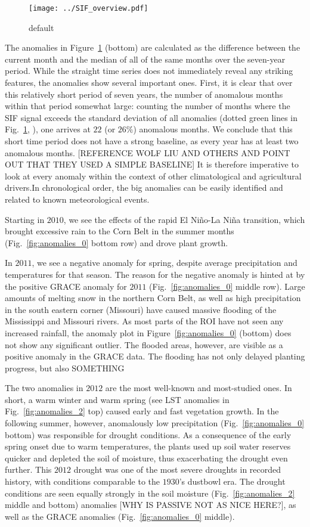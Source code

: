 \documentclass[preprint, a4paper, 10pt, times]{elsarticle}
\begin{document}
\begin{figure}[htbp]
\centering
\texttt{[image: ../SIF\_overview.pdf]}
\caption{default}
\label{fig:sif_ts}
\end{figure}

The anomalies in Figure~\ref{fig:sif_ts} (bottom) are calculated as the difference between the current month and the median of all of the same months over the seven-year period. While the straight time series does not immediately reveal any striking features, the anomalies show several important ones. First, it is clear that over this relatively short period of seven years, the number of anomalous months within that period somewhat large: counting the number of months where the SIF signal exceeds the standard deviation of all anomalies (dotted green lines in Fig.~\ref{fig:sif_ts}, ), one arrives at $22$ (or $26\%$) anomalous months. We conclude that this short time period does not have a strong baseline, as every year has at least two anomalous months. [REFERENCE WOLF LIU AND OTHERS AND POINT OUT THAT THEY USED A SIMPLE BASELINE] It is therefore imperative to look at every anomaly within the context of other climatological and agricultural drivers.In chronological order, the big anomalies can be easily identified and related to known meteorological events. 

Starting in $2010$, we see the effects of the rapid El Ni\~no-La Ni\~na transition, which brought excessive rain to the Corn Belt in the summer months (Fig.~\ref{fig:anomalies_0} bottom row) and drove plant growth.

In $2011$, we see a negative anomaly for spring, despite average precipitation and temperatures for that season. The reason for the negative anomaly is hinted at by the positive GRACE anomaly for $2011$ (Fig.~\ref{fig:anomalies_0} middle row). Large amounts of melting snow in the northern Corn Belt, as well as high precipitation in the south eastern corner (Missouri) have caused massive flooding of the Mississippi and Missouri rivers. As most parts of the ROI have not seen any increased rainfall, the anomaly plot in Figure~\ref{fig:anomalies_0} (bottom) does not show any significant outlier. The flooded areas, however, are visible as a positive anomaly in the GRACE data. The flooding has not only delayed planting progress, but also SOMETHING

The two anomalies in $2012$ are the most well-known and most-studied ones. In short, a warm winter and warm spring (see LST anomalies in Fig.~\ref{fig:anomalies_2} top) caused early and fast vegetation growth. In the following summer, however, anomalously low precipitation (Fig.~\ref{fig:anomalies_0} bottom) was responsible for drought conditions. As a consequence of the early spring onset due to warm temperatures, the plants used up soil water reserves quicker and depleted the soil of moisture, thus exacerbating the drought even further. This $2012$ drought was one of the most severe droughts in recorded history, with conditions comparable to the $1930$'s dustbowl era. The drought conditions are seen equally strongly in the soil moisture (Fig.~\ref{fig:anomalies_2} middle and bottom) anomalies [WHY IS PASSIVE NOT AS NICE HERE?], as well as the GRACE anomalies (Fig.~\ref{fig:anomalies_0} middle). 
\end{document}
